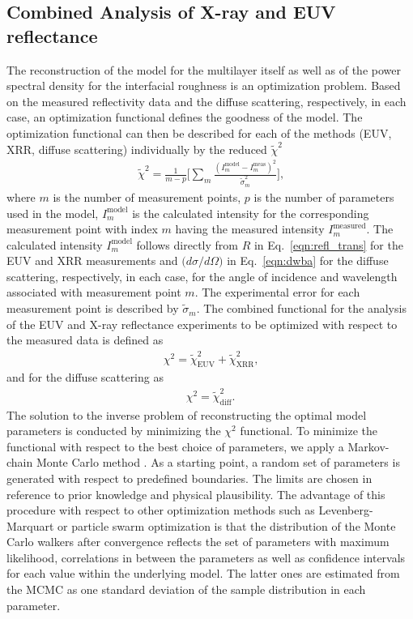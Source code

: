 \subsection{Combined Analysis of X-ray and EUV reflectance}
The reconstruction of the model for the multilayer itself as well as of the power spectral density for the interfacial roughness is an optimization problem. Based on the measured reflectivity data and the diffuse scattering, respectively, in each case, an optimization functional defines the goodness of the model. The optimization functional can then be described for each of the methods (EUV, XRR, diffuse scattering) individually by the reduced $\tilde{\chi}^2$
\begin{align}
\tilde{\chi}^2 = \frac{1}{m - p} \bigg[\sum\limits_{m} \frac{(I_m^\text{model} 
- I_m^\text{meas})^2}{\tilde{\sigma}_m^2} \bigg] \text{,} 
\label{eqn:reduced_chi_2}
\end{align}
where $m$ is the number of measurement points, $p$ is the number of parameters used in the model, $I_m^\text{model}$ is the calculated intensity for the corresponding measurement point with index $m$ having the measured intensity $I_m^\text{measured}$. The calculated intensity $I_m^\text{model}$ follows directly from $R$ in Eq.~\eqref{eqn:refl_trans} for the EUV and XRR measurements and $\big(d \sigma/d \Omega\big)$ in Eq.~\eqref{eqn:dwba} for the diffuse scattering, respectively, in each case, for the angle of incidence and wavelength associated with measurement point $m$. The experimental error for each measurement point is described by $\tilde{\sigma}_m$. The combined functional for the analysis of the EUV and X-ray reflectance experiments to be optimized with respect to the measured data is defined as
\begin{align}
\chi^2 = \tilde{\chi}^2_\text{EUV} +\tilde{\chi}^2_\text{XRR} \text{,}
\label{eqn:total_chi_2}
\end{align}
and for the diffuse scattering as
\begin{align}
\chi^2 = \tilde{\chi}^2_\text{diff} \text{.} \label{eqn:total_chi_2_diffuse}
\end{align}
The solution to the inverse problem of reconstructing the optimal model parameters is conducted by minimizing the $\chi^2$ functional. To minimize the functional with respect to the best choice of parameters, we apply a Markov-chain Monte Carlo method \cite{goodman_ensemble_2010,foreman-mackey_emcee:_2013,haase_multiparameter_2016}. As a starting point, a random set of parameters is generated with respect to predefined boundaries. The limits are chosen in reference to prior knowledge and physical plausibility. The advantage of this procedure with respect to other optimization methods such as Levenberg-Marquart \cite{levenberg_method_1944,marquardt_algorithm_1963} or particle swarm optimization \cite{kennedy_particle_2011} is that the distribution of the Monte Carlo walkers after convergence reflects the set of parameters with maximum likelihood, correlations in between the parameters as well as confidence intervals for each value within the underlying model. The latter ones are estimated from the MCMC as one standard deviation of the sample distribution in each parameter.

